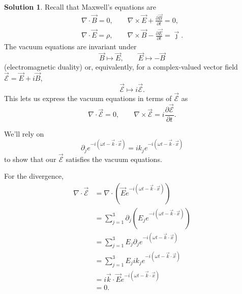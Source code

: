 \documentclass[11pt, a4paper]{article}
\theoremstyle{definition}
\newtheorem{sol}{Solution}[part]
\begin{document}
\begin{sol}

Recall that Maxwell's equations are
\begin{gather*}
    \nabla \cdot \vec{B} = 0, \qquad
    \nabla \times \vec{E} + \frac{\partial \vec{B}}{\partial t} = 0, \\
    \nabla \cdot \vec{E} = \rho, \qquad
    \nabla \times \vec{B} - \frac{\partial \vec{E}}{\partial t} = \vec{\jmath}.
\end{gather*}
The vacuum equations are invariant under
\[
    \vec{B} \mapsto \vec{E}, \qquad
    \vec{E} \mapsto - \vec{B}
\]
(electromagnetic duality) or, equivalently, for a complex-valued vector field $\vec{\mathcal{E}} = \vec{E} + i \vec{B}$,
\[
    \vec{\mathcal{E}} \mapsto i \vec{\mathcal{E}}.
\]
This lets us express the vacuum equations in terms of $\vec{\mathcal{E}}$ as
\[
    \nabla \cdot \vec{\mathcal{E}} = 0, \qquad
    \nabla \times \vec{\mathcal{E}} = i \frac{\partial \vec{\mathcal{E}}}{\partial t}.
\]

We'll rely on
\[
    \partial_j e^{-i(\omega t - \vec{k} \cdot \vec{x})} = i k_j e^{-i(\omega t - \vec{k} \cdot \vec{x})}
\]
to show that our $\vec{\mathcal{E}}$ satisfies the vacuum equations.

For the divergence,
\begin{align*}
    \nabla \cdot \vec{\mathcal{E}} &= \nabla \cdot \left(\vec{E} e^{-i(\omega t - \vec{k} \cdot \vec{x})}\right) \\
        &= \sum_{j = 1}^3 \partial_j \left( E_j  e^{-i(\omega t - \vec{k} \cdot \vec{x})} \right) \\
        &= \sum_{j = 1}^3 E_j \partial_j e^{-i(\omega t - \vec{k} \cdot \vec{x})} \\
        &= \sum_{j = 1}^3 E_j i k_j e^{-i(\omega t - \vec{k} \cdot \vec{x})} \\
        &= i \vec{k} \cdot \vec{E} e^{-i(\omega t - \vec{k} \cdot \vec{x})} \\
        &= 0.
\end{align*}


\end{sol}
\end{document}
